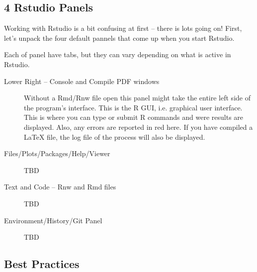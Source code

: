 \documentclass[12pt]{../SOP3_beta}
\begin{document}
\subsection{4 Rstudio Panels}

Working with Rstudio is a bit confusing at first -- there is lots going on! First, let's unpack the four default pannels that come up when you start Rstudio. 

\NP Each of panel have tabs, but they can vary depending on what is active in Rstudio. 

\begin{description}
  \item[Lower Right -- Console and Compile PDF windows] Without a Rmd/Rnw file open this panel might take the entire left side of the program's interface. This is the R GUI, i.e. graphical user interface. This is where you can type or submit R commands and were results are displayed. Also, any errors are reported in red here. If you have compiled a LaTeX file, the log file of the process will also be displayed.
  \item[Files/Plots/Packages/Help/Viewer] TBD
  \item[Text and Code -- Rnw and Rmd files] TBD

  \item[Environment/History/Git Panel] TBD
\end{description}

\subsection{Best Practices}
\end{document}
